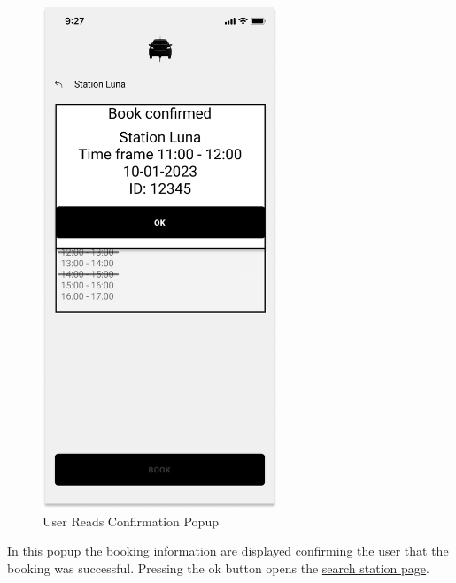 \begin{figure}[H]
    \centering
    \includegraphics[keepaspectratio, height=15cm]{Mockup/UserAppInterface/Book Confirmation.png}
    \caption{User Reads Confirmation Popup}
    \label{pop:BookingConfirmed}
\end{figure}
In this popup the booking information are displayed confirming the user that the booking was successful. Pressing the ok button opens the \hyperref[fig:Search]{search station page}.
